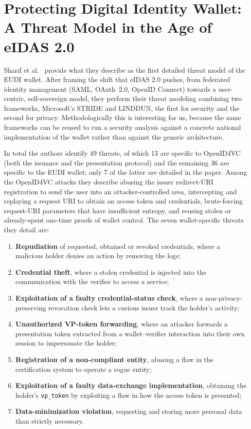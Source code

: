 \documentclass[binding=0.6cm,oneside,noexaminfo]{sapthesis}
\begin{document}
\section{Protecting Digital Identity Wallet: A Threat Model in the Age of eIDAS 2.0}
\label{protectingeudi}
Sharif et al.~\cite{Sharif2024Protecting} provide what they describe as the first detailed threat model of the EUDI
wallet. After framing the shift that eIDAS 2.0 pushes, from federated identity management (SAML, OAuth~2.0, OpenID
Connect) towards a user-centric, self-sovereign model, they perform their threat modeling combining two frameworks,
Microsoft's STRIDE and LINDDUN, the first for security and the second for privacy. Methodologically this is interesting
for us, because the same frameworks can be reused to run a security analysis against a concrete national implementation
of the wallet rather than against the generic architecture.

In total the authors identify 49 threats, of which 13 are specific to OpenID4VC (both the issuance and the presentation
protocol) and the remaining 36 are specific to the EUDI wallet; only 7 of the latter are detailed in the paper. Among
the OpenID4VC attacks they describe abusing the issuer redirect-URI registration to send the user into an
attacker-controlled area, intercepting and replaying a request URI to obtain an access token and credentials,
brute-forcing request-URI parameters that have insufficient entropy, and reusing stolen or already-spent one-time
proofs of wallet control. The seven wallet-specific threats they detail are:
\begin{enumerate}[noitemsep]
  \item \textbf{Repudiation} of requested, obtained or revoked credentials, where a malicious holder denies an action by removing the logs;
  \item \textbf{Credential theft}, where a stolen credential is injected into the communication with the verifier to access a service;
  \item \textbf{Exploitation of a faulty credential-status check}, where a non-privacy-preserving revocation check lets a curious issuer track the holder's activity;
  \item \textbf{Unauthorized VP-token forwarding}, where an attacker forwards a presentation token extracted from a wallet--verifier interaction into their own session to impersonate the holder;
  \item \textbf{Registration of a non-compliant entity}, abusing a flaw in the certification system to operate a rogue entity;
  \item \textbf{Exploitation of a faulty data-exchange implementation}, obtaining the holder's \texttt{vp\_token} by exploiting a flaw in how the access token is presented;
  \item \textbf{Data-minimization violation}, requesting and storing more personal data than strictly necessary.
\end{enumerate}
\end{document}
